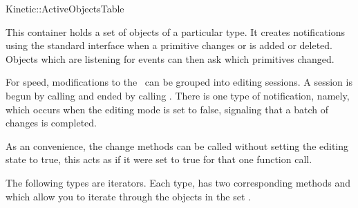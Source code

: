 

\begin{ccRefConcept}{Kinetic::ActiveObjectsTable}  %


\ccDefinition
  

This container holds a set of objects of a particular type. It creates
notifications using the standard 
interface when a primitive changes or is added or deleted. Objects
which are listening for events can then ask which primitives changed.

For speed, modifications to the \ccRefName\ can be grouped into
editing sessions. A session is begun by calling
 and ended by calling .
There is one type of notification, namely, 
which occurs when the editing mode is set to false, signaling that a
batch of changes is completed.

As an convenience, the change methods can be called without setting
the editing state to true, this acts as if it were set to true for
that one function call.

\ccTypes




The following types are iterators. Each type,  has
two corresponding methods  and  which
allow you to iterate through the objects in the set .



\end{ccRefConcept}
